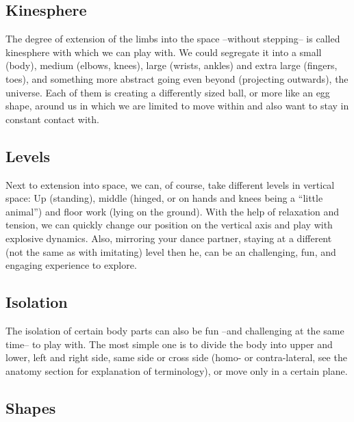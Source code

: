 \subsection{Kinesphere}\label{subsec:kinesphere}

The degree of extension of the limbs into the space --without stepping-- is called \gls{kinesphere} with which we can play with.
We could segregate it into a small (body), medium (elbows, knees), large (wrists, ankles) and extra large (fingers, toes), and something more abstract going even beyond (projecting outwards), the universe.
Each of them is creating a differently sized ball, or more like an egg shape, around us in which we are limited to move within and also want to stay in constant contact with.

\subsection{Levels}\label{subsec:levels}

Next to extension into space, we can, of course, take different levels in vertical space: Up (standing), middle (hinged, or on hands and knees being a ``little animal'') and floor work (lying on the ground).
With the help of relaxation and tension, we can quickly change our position on the vertical axis and play with explosive dynamics.
Also, mirroring your dance partner, staying at a different (not the same as with imitating) level then he, can be an challenging, fun, and engaging experience to explore.

\subsection{Isolation}\label{subsec:isolation}

The isolation of certain body parts can also be fun --and challenging at the same time-- to play with.
The most simple one is to divide the body into upper and lower, left and right side, same side or cross side (homo- or contra-lateral, see the anatomy section for explanation of terminology), or move only in a certain plane.

\subsection{Shapes}\label{subsec:shapes}

